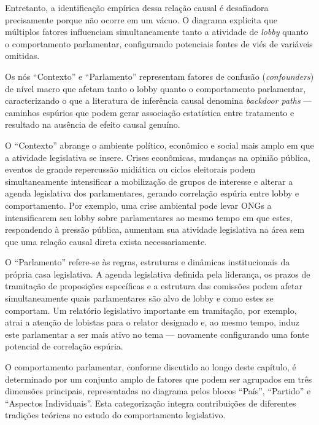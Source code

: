 Entretanto, a identificação empírica dessa relação causal é desafiadora precisamente porque não ocorre em um vácuo. O diagrama explicita que múltiplos fatores influenciam simultaneamente tanto a atividade de \textit{lobby} quanto o comportamento parlamentar, configurando potenciais fontes de viés de variáveis omitidas.

Os nós ``Contexto'' e ``Parlamento'' representam fatores de confusão (\textit{confounders}) de nível macro que afetam tanto o lobby quanto o comportamento parlamentar, caracterizando o que a literatura de inferência causal denomina \textit{backdoor paths} — caminhos espúrios que podem gerar associação estatística entre tratamento e resultado na ausência de efeito causal genuíno.

O ``Contexto'' abrange o ambiente político, econômico e social mais amplo em que a atividade legislativa se insere. Crises econômicas, mudanças na opinião pública, eventos de grande repercussão midiática ou ciclos eleitorais podem simultaneamente intensificar a mobilização de grupos de interesse e alterar a agenda legislativa dos parlamentares, gerando correlação espúria entre lobby e comportamento. Por exemplo, uma crise ambiental pode levar ONGs a intensificarem seu lobby sobre parlamentares ao mesmo tempo em que estes, respondendo à pressão pública, aumentam sua atividade legislativa na área sem que uma relação causal direta exista necessariamente.

O ``Parlamento'' refere-se às regras, estruturas e dinâmicas institucionais da própria casa legislativa. A agenda legislativa definida pela liderança, os prazos de tramitação de proposições específicas e a estrutura das comissões podem afetar simultaneamente quais parlamentares são alvo de lobby e como estes se comportam. Um relatório legislativo importante em tramitação, por exemplo, atrai a atenção de lobistas para o relator designado e, ao mesmo tempo, induz este parlamentar a ser mais ativo no tema — novamente configurando uma fonte potencial de correlação espúria.

O comportamento parlamentar, conforme discutido ao longo deste capítulo, é determinado por um conjunto amplo de fatores que podem ser agrupados em três dimensões principais, representadas no diagrama pelos blocos ``País'', ``Partido'' e ``Aspectos Individuais''. Esta categorização integra contribuições de diferentes tradições teóricas no estudo do comportamento legislativo.


